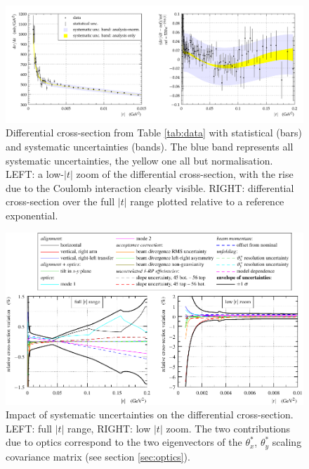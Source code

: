 \begin{figure}
\vskip-5mm
\begin{center}
\includegraphics[width=18cm]{fig/t_dist_tabulation.pdf}
\vskip-3mm
\caption{%
Differential cross-section from Table \ref{tab:data} with statistical (bars) and systematic uncertainties (bands). The blue band represents all systematic uncertainties, the yellow one all but normalisation. LEFT: a low-$|t|$ zoom of the differential cross-section, with the rise due to the Coulomb interaction clearly visible. RIGHT: differential cross-section over the full $|t|$ range plotted relative to a reference exponential.
}
\label{fig:dsdt}
\end{center}
\end{figure}


\begin{figure}
\begin{center}
\includegraphics{fig/systematic_uncertainties.pdf}
\caption{%
Impact of systematic uncertainties on the differential cross-section. 
LEFT: full $|t|$ range, RIGHT: low $|t|$ zoom.
The two contributions due to optics correspond to the two eigenvectors of the $\theta_x^*$, $\theta_y^*$ scaling covariance matrix (see section \ref{sec:optics}).
}
\label{fig:syst unc}
\end{center}
\end{figure}
